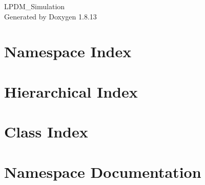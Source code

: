\documentclass[twoside]{book}
\newcommand{\+}{\discretionary{\mbox{\scriptsize$\hookleftarrow$}}{}{}}
\newcommand{\clearemptydoublepage}{%
  \newpage{\pagestyle{empty}\cleardoublepage}%
}
\begin{document}
\hypersetup{pageanchor=false,
             bookmarksnumbered=true,
             pdfencoding=unicode
            }
\begin{titlepage}
\vspace*{7cm}
\begin{center}%
{\Large L\+P\+D\+M\+\_\+\+Simulation }\\
\vspace*{1cm}
{\large Generated by Doxygen 1.8.13}\\
\end{center}
\end{titlepage}
\clearemptydoublepage
{}
\tableofcontents
\clearemptydoublepage
{}
\hypersetup{pageanchor=true}

\chapter{Namespace Index}

\chapter{Hierarchical Index}

\chapter{Class Index}

\chapter{Namespace Documentation}


\end{document}
